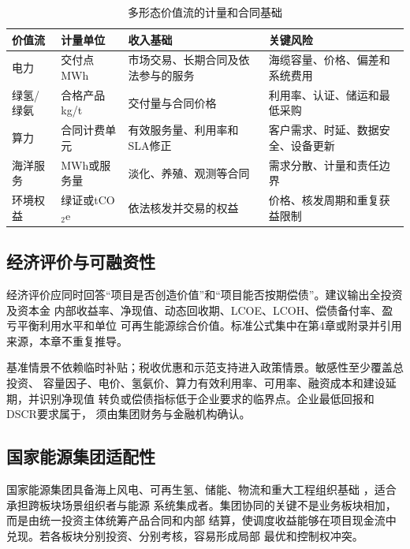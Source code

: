 \begin{table}[H]
\centering
\caption{多形态价值流的计量和合同基础}
\label{tab:c6-value-streams}
\small
\begin{tabularx}{\textwidth}{p{2.2cm} p{2.2cm} X X}
\toprule
价值流 & 计量单位 & 收入基础 & 关键风险\\
\midrule
电力 & 交付点MWh & 市场交易、长期合同及依法参与的服务 & 海缆容量、价格、偏差和系统费用\\
绿氢/绿氨 & 合格产品kg/t & 交付量与合同价格 & 利用率、认证、储运和最低采购\\
算力 & 合同计费单元 & 有效服务量、利用率和SLA修正 & 客户需求、时延、数据安全、设备更新\\
海洋服务 & MWh或服务量 & 淡化、养殖、观测等合同 & 需求分散、计量和责任边界\\
环境权益 & 绿证或tCO$_2$e & 依法核发并交易的权益 & 价格、核发周期和重复获益限制\\
\bottomrule
\end{tabularx}
\end{table}

\subsection{经济评价与可融资性}

经济评价应同时回答“项目是否创造价值”和“项目能否按期偿债”。建议输出全投资及资本金
内部收益率、净现值、动态回收期、LCOE、LCOH、偿债备付率、盈亏平衡利用水平和单位
可再生能源综合价值。标准公式集中在第4章或附录并引用来源，本章不重复推导。

基准情景不依赖临时补贴；税收优惠和示范支持进入政策情景。敏感性至少覆盖总投资、
容量因子、电价、氢氨价、算力有效利用率、可用率、融资成本和建设延期，并识别净现值
转负或偿债指标低于企业要求的临界点。企业最低回报和DSCR要求属于\assumptiontag，
须由集团财务与金融机构确认。

\subsection{国家能源集团适配性}

国家能源集团具备海上风电、可再生氢、储能、物流和重大工程组织基础
\cite{chnenergy-new-productivity,chnenergy-hydrogen}，适合承担跨板块场景组织者与能源
系统集成者。集团协同的关键不是业务板块相加，而是由统一投资主体统筹产品合同和内部
结算，使调度收益能够在项目现金流中兑现。若各板块分别投资、分别考核，容易形成局部
最优和控制权冲突。

